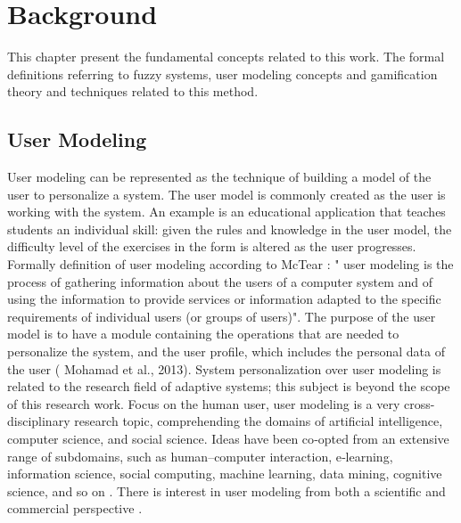 
\chapter{Background}

This chapter present the fundamental concepts related to this work. The
formal definitions referring to fuzzy systems, user modeling concepts  and  gamification theory and techniques related to this method.
\section{User Modeling}


User modeling can be represented as the technique of building a model of the
user to personalize a system. The user model is commonly created as the user is
working with the system. An example is an educational application that teaches
students an individual skill: given the rules and knowledge in the user model,
the difficulty level of the exercises in the form is altered as the user
progresses.   Formally definition of user modeling according to McTear \cite{mctear1993user} : " user modeling is the process of gathering information about the users of
a computer system and of using the information to provide services or
information adapted to the specific requirements of individual users (or groups
of users)". The purpose of the user model is to have a module containing the
operations that are needed to personalize the system, and the user profile,
which includes the personal data of the user \cite{}( Mohamad et al., 2013).    System
personalization over user modeling is related to the research field of adaptive
systems; this subject is beyond the scope of this research work. Focus on the
human user, user modeling is a very cross-disciplinary research topic,
comprehending the domains of artificial intelligence, computer science, and
social science. Ideas have been co‐opted from an extensive range of subdomains,
such as human–computer interaction, e‐learning, information science, social
computing, machine learning, data mining, cognitive science, and so on \cite{kay2012coming}
\cite{kobsa2001generic}. There is interest in user modeling from both a
scientific and commercial perspective \cite{razmerita2009user}.

